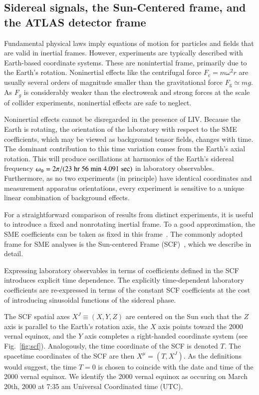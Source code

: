 \subsection{Sidereal signals, the Sun-Centered frame, and the ATLAS detector frame}
\label{ssec:sidereal}
%
%
Fundamental physical laws imply equations
of motion for particles and 
fields that are valid in inertial frames.
However, experiments are typically
described with Earth-based coordinate 
systems. These are nonintertial frame, primarily 
due to the Earth's rotation. 
Noninertial effects like the
centrifugal force $F_{\text{c}} = m\omega^2 r$
are usually several orders of magnitude smaller than the
gravitational force $F_{\text{g}} \simeq mg$. As $F_g$
is considerably weaker than the electroweak 
and strong forces at the scale
of collider experiments, noninertial
effects are safe to neglect. 

Noninertial effects cannot be disregarded in the presence of LIV.
Because the Earth is rotating, 
the orientation of the laboratory with respect to the SME coefficients,
which may be viewed as background tensor fields, changes with time.
The dominant contribution to this time variation 
comes from the Earth's axial rotation.
This will produce oscillations at harmonics of the Earth's sidereal frequency 
$\omega_\oplus = 2\pi/(\text 23\; \text{hr}\; 56\; \text{min}\; 4.091\; \text{sec})$
in laboratory observables.
Furthermore, as no two experiments (in principle)
have identical coordinates and measurement apparatus orientations,
every experiment is sensitive to a unique linear combination of background effects. 

For a straightforward comparison of results from distinct experiments, it is
useful to introduce a fixed and nonrotating inertial frame. To a good approximation,
the SME coefficients can be taken as fixed in this frame~\cite{ak04}. 
The commonly adopted frame for SME analyses is the 
Sun-centered Frame (SCF)~\cite{kd16,km02,k2000,klv17,ls18,km09}, 
which we describe in detail.

Expressing laboratory observables
in terms of coefficients defined 
in the SCF introduces explicit time dependence.
The explicitly time-dependent laboratory coefficients
are re-expressed in terms of the constant SCF coefficients 
at the cost of introducing sinusoidal functions of the sidereal phase. 

The SCF spatial axes $X^J \equiv (X, Y, Z)$ are
centered on the Sun such that 
the $Z$ axis is parallel to the Earth's rotation axis, 
the $X$ axis points toward the 2000 vernal equinox, 
and the $Y$ axis completes a right-handed coordinate system (see Fig.~\ref{fig:scf}).
Analogously, the time coordinate of the SCF is denoted $T$.
The spacetime coordinates of the SCF are then $X^\mu = (T,X^J)$.
As the definitions would suggest, the time $T=0$ is chosen to coincide 
with the date and time of the 2000 vernal equinox. 
We identify the 2000 vernal equinox as occuring
on March 20th, 2000 at 7:35 am Universal Coordinated time (UTC).

